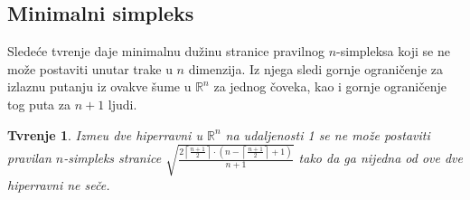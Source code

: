 \documentclass[11pt,letter]{article}
\newtheorem{tvr}[teo]{\bf Tvr\dj enje}
\begin{document}
\smallskip
\subsection[Minimalni simpleks]{Minimalni simpleks}
\bigskip

\indent Slede\' ce tvr\dj enje daje minimalnu du\v zinu stranice pravilnog $n$-simpleksa koji se ne mo\v ze postaviti unutar trake u $n$ dimenzija. Iz njega sledi gornje ograni\v cenje za izlaznu putanju iz ovakve \v sume u $\mathbb{R}^n$ za jednog \v coveka, kao i gornje ograni\v cenje tog puta za $n+1$ ljudi. 
\smallskip

\begin{tvr} Izme\dj u dve hiperravni u $\mathbb{R}^n$ na udaljenosti 1 se ne mo\v ze postaviti pravilan $n$-simpleks stranice $\sqrt{\frac{2\left\lceil \frac{n+1}{2}\right\rceil\cdot \left( n-\left\lceil\frac{n+1}{2}\right\rceil+1\right)}{n+1}}$ tako da ga nijedna od ove dve hiperravni ne se\v ce.
\end{tvr}
\end{document}
